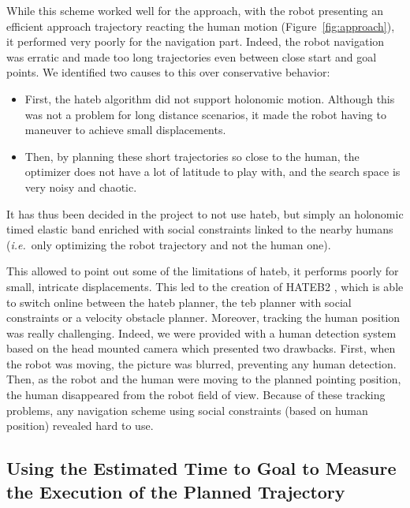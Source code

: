 \documentclass[a4paper,11pt,twoside]{StyleThese}
\begin{document}
While this scheme worked well for the approach, with the robot presenting an efficient approach trajectory reacting the human motion (Figure~\ref{fig:approach}), it performed very poorly for the navigation part. Indeed, the robot navigation was erratic and made too long trajectories even between close start and goal points. We identified two causes to this over conservative behavior:

\begin{itemize}
\item First, the \acrshort{hateb} algorithm did not support holonomic motion. Although this was not a problem for long distance scenarios, it made the robot having to maneuver to achieve small displacements.

\item Then, by planning these short trajectories so close to the human, the optimizer does not have a lot of latitude to play with, and the search space is very noisy and chaotic.
\end{itemize}

It has thus been decided in the project to not use \acrshort{hateb}, but simply an holonomic timed elastic band enriched with social constraints linked to the nearby humans (\textit{i.e.}~only optimizing the robot trajectory and not the human one).

This allowed to point out some of the limitations of \acrshort{hateb}, it performs poorly for small, intricate displacements. This led to the creation of HATEB2 \cite{singamaneni2020hateb}, which is able to switch online between the \acrshort{hateb} planner, the \acrshort{teb} planner with social constraints or a velocity obstacle planner. Moreover, tracking the human position was really challenging. Indeed, we were provided with a human detection system based on the head mounted camera which presented two drawbacks. First, when the robot was moving, the picture was blurred, preventing any human detection. Then, as the robot and the human were moving to the planned pointing position, the human disappeared from the robot field of view. Because of these tracking problems, any navigation scheme using social constraints (based on human position) revealed hard to use.

\subsection{Using the Estimated Time to Goal to Measure the Execution of the Planned Trajectory}
\end{document}
